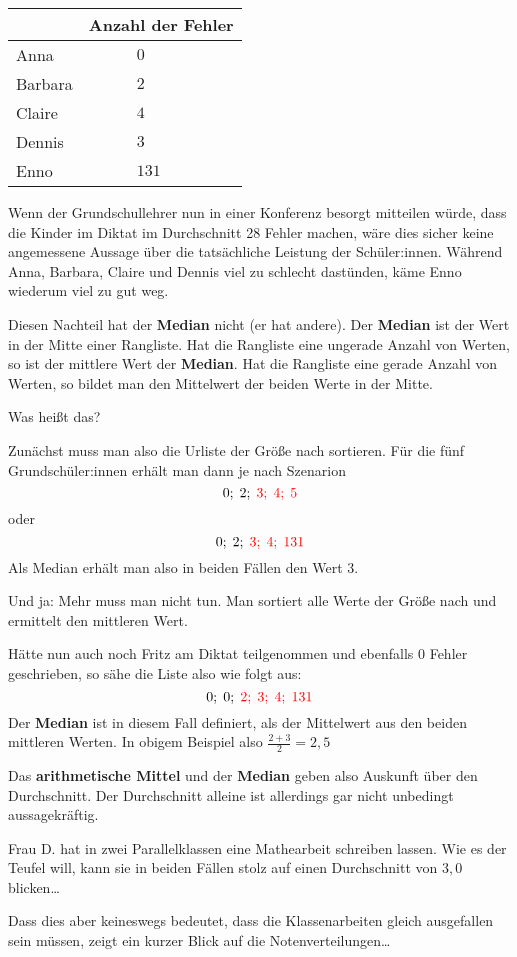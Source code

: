 \documentclass[
  ngerman,
]{book}
\begin{document}
\begin{longtable}[]{@{}ll@{}}
\toprule
& Anzahl der Fehler\tabularnewline
\midrule
\endhead
Anna & \(\quad\quad\quad 0\)\tabularnewline
Barbara & \(\quad\quad\quad 2\)\tabularnewline
Claire & \(\quad\quad\quad 4\)\tabularnewline
Dennis & \(\quad\quad\quad 3\)\tabularnewline
Enno & \(\quad\quad\quad 131\)\tabularnewline
\bottomrule
\end{longtable}

Wenn der Grundschullehrer nun in einer Konferenz besorgt mitteilen würde, dass die Kinder im Diktat im Durchschnitt 28 Fehler machen, wäre dies sicher keine angemessene Aussage über die tatsächliche Leistung der Schüler:innen. Während Anna, Barbara, Claire und Dennis viel zu schlecht dastünden, käme Enno wiederum viel zu gut weg.

Diesen Nachteil hat der \textbf{Median} nicht (er hat andere). Der \textbf{Median} ist der Wert in der Mitte einer Rangliste. Hat die Rangliste eine ungerade Anzahl von Werten, so ist der mittlere Wert der \textbf{Median}. Hat die Rangliste eine gerade Anzahl von Werten, so bildet man den Mittelwert der beiden Werte in der Mitte.

Was heißt das?

Zunächst muss man also die Urliste der Größe nach sortieren. Für die fünf Grundschüler:innen erhält man dann je nach Szenarion
\[0;\; 2;\; \color{red}{3};\; 4;\; 5\]
oder
\[0;\; 2;\; \color{red}{3};\; 4;\; 131\]
Als Median erhält man also in beiden Fällen den Wert 3.

Und ja: Mehr muss man nicht tun. Man sortiert alle Werte der Größe nach und ermittelt den mittleren Wert.

Hätte nun auch noch Fritz am Diktat teilgenommen und ebenfalls 0 Fehler geschrieben, so sähe die Liste also wie folgt aus:
\[0;\;0;\; \color{red}{2};\; \color{red}{3};\; 4;\; 131\]
Der \textbf{Median} ist in diesem Fall definiert, als der Mittelwert aus den beiden mittleren Werten. In obigem Beispiel also \(\frac{2+3}{2}=2,5\)

Das \textbf{arithmetische Mittel} und der \textbf{Median} geben also Auskunft über den Durchschnitt. Der Durchschnitt alleine ist allerdings gar nicht unbedingt aussagekräftig.

Frau D. hat in zwei Parallelklassen eine Mathearbeit schreiben lassen. Wie es der Teufel will, kann sie in beiden Fällen stolz auf einen Durchschnitt von \(3,0\) blicken\ldots{}

Dass dies aber keineswegs bedeutet, dass die Klassenarbeiten gleich ausgefallen sein müssen, zeigt ein kurzer Blick auf die Notenverteilungen\ldots{}
\end{document}
